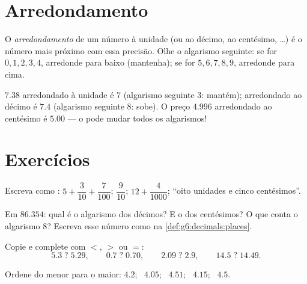 \section{Arredondamento}

\begin{definition}[Arredondamento]\label{def:g6:decimals:rounding}
O \emph{arredondamento} de um número à unidade
(ou ao décimo, ao centésimo, \dots) é o número mais próximo com essa
precisão. Olhe o algarismo seguinte: se for $0,1,2,3,4$, arredonde para
baixo (mantenha); se for $5,6,7,8,9$, arredonde para cima.
\end{definition}

\begin{example}
$7.38$ arredondado à unidade é $7$ (algarismo seguinte $3$: mantém);
arredondado ao décimo é $7.4$ (algarismo seguinte $8$: sobe). O preço
$4.996$ arredondado ao centésimo é $5.00$ --- o  pode
mudar todos os algarismos!
\end{example}

\section{Exercícios}

\begin{exercise}[$\star$]\label{exo:g6:decimals:1}
Escreva como : $5 + \dfrac{3}{10} + \dfrac{7}{100}$;
\quad $\dfrac{9}{10}$; \quad $12 + \dfrac{4}{1000}$;
\quad ``oito unidades e cinco centésimos''.
\end{exercise}

\begin{exercise}[$\star$]\label{exo:g6:decimals:2}
Em $86.354$: qual é o algarismo dos décimos? E o dos centésimos? O que
conta o algarismo $8$? Escreva esse número como na
\cref{def:g6:decimals:places}.
\end{exercise}

\begin{exercise}[$\star$]\label{exo:g6:decimals:3}
Copie e complete com $<$, $>$ ou $=$:
\[
5.3 \;?\; 5.29, \qquad
0.7 \;?\; 0.70, \qquad
2.09 \;?\; 2.9, \qquad
14.5 \;?\; 14.49 .
\]
\end{exercise}

\begin{exercise}[$\star$]\label{exo:g6:decimals:4}
Ordene do menor para o maior:
$4.2$; \ $4.05$; \ $4.51$; \ $4.15$; \ $4.5$.
\end{exercise}

